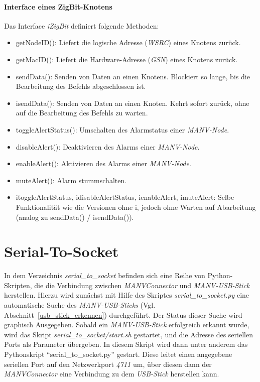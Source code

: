     \paragraph{Interface eines ZigBit-Knotens}

    Das Interface \emph{iZigBit} definiert folgende Methoden:

    \begin{itemize}
        \item{getNodeID():} Liefert die logische Adresse (\emph{WSRC}) eines Knotens zurück.
        \item{getMacID():} Liefert die Hardware-Adresse (\emph{GSN}) eines Knotens zurück.
        \item{sendData():} Senden von Daten an einen Knotens. Blockiert so lange, bis die Bearbeitung des
                           Befehls abgeschlossen ist.
        \item{isendData():} Senden von Daten an einen Knoten. Kehrt sofort zurück, ohne auf die Bearbeitung
                            des Befehls zu warten.
        \item{toggleAlertStatus():} Umschalten des Alarmstatus einer \emph{MANV-Node}.
        \item{disableAlert():} Deaktivieren des Alarms einer \emph{MANV-Node}.
        \item{enableAlert():} Aktivieren des Alarms einer \emph{MANV-Node}.
        \item{muteAlert():} Alarm stummschalten.
        \item{itoggleAlertStatus, idisableAlertStatus, ienableAlert, imuteAlert}: Selbe Funktionalität
            wie die Versionen ohne i, jedoch ohne Warten auf Abarbeitung (analog zu sendData() / isendData()).
    \end{itemize}

    \section{Serial-To-Socket}

    In dem Verzeichnis \emph{serial\_to\_socket} befinden sich eine Reihe von Python-Skripten, die die
    Verbindung zwischen \emph{MANVConnector} und \emph{MANV-USB-Stick} herstellen. Hierzu 
    wird zunächst mit Hilfe des Skriptes \emph{serial\_to\_socket.py} eine automatische Suche des
    \emph{MANV-USB-Sticks} (Vgl. Abschnitt~\ref{usb_stick_erkennen}) durchgeführt. Der Status
    dieser Suche wird graphisch Ausgegeben. Sobald ein \emph{MANV-USB-Stick} erfolgreich
    erkannt wurde, wird das Skript \emph{serial\_to\_socket/start.sh} gestartet, und die
    Adresse des seriellen Ports als Parameter übergeben. In diesem Skript wird
    dann unter anderem das Pythonskript "`serial\_to\_socket.py"' gestart. Diese leitet einen
    angegebene seriellen Port auf den Netzwerkport \emph{4711} um, über diesen dann der
    \emph{MANVConnector} eine Verbindung zu dem \emph{USB-Stick} herstellen kann.
    

